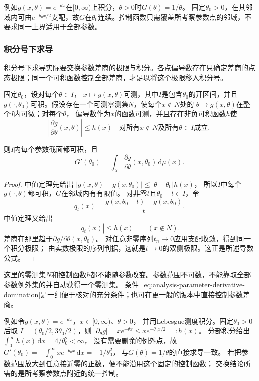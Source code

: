 例如$g(x,\theta)=e^{-\theta x}$在$[0,\infty)$上积分，$\theta>0$时$G(\theta)=1/\theta$。
固定$\theta_0>0$，在其邻域内可由$e^{-\theta_0x/2}$支配，故$G$在$\theta_0$连续。控制函数只需覆盖所考察参数点的邻域，不要求同一上界适用于全部参数。

\subsubsection{积分号下求导}

积分号下求导实际要交换参数差商的极限与积分。各点偏导数存在只确定差商的点态极限；同一个可积函数控制全部差商，才足以将这个极限移入积分号。
\begin{theorem}[可积导数界下的积分号内求导]
固定$\theta_0$，设对每个$\theta\in I$，
$x\mapsto g(x,\theta)$可测，其中$I$是包含$\theta_0$的开区间，并且
$g(\cdot,\theta_0)$可积。假设存在一个可测零测集$N$，使每个$x\notin N$处的
$\theta\mapsto g(x,\theta)$在整个$I$内可微；对每个$\theta$，
偏导数作为$x$的函数可测，并且存在非负可积函数$h$使
\begin{equation}
  \left|
    \frac{\partial g}{\partial\theta}(x,\theta)
  \right|
  \leq h(x)
  \quad
  \text{对所有$x\notin N$及所有$\theta\in I$成立},
\label{eq:analysis-parameter-derivative-domination}
\end{equation}

则$I$内每个参数截面都可积，且
\begin{equation}
  G'(\theta_0)
  =
  \int_X
  \frac{\partial g}{\partial\theta}(x,\theta_0)
  \,\mathrm{d}\mu(x).
\label{eq:analysis-differentiate-under-integral}
\end{equation}
\end{theorem}
\begin{proof}
中值定理先给出
$|g(x,\theta)-g(x,\theta_0)|\leq|\theta-\theta_0|h(x)$，
所以$I$中每个$g(\cdot,\theta)$都可积，$G$在邻域内有有限值。
对非零$t$且$\theta_0+t\in I$，令
\[
 q_t(x)=\frac{g(x,\theta_0+t)-g(x,\theta_0)}{t}.
\]
中值定理又给出
\[
 |q_t(x)|\leq h(x)\qquad(x\notin N).
\]
差商在那里趋于$\partial g/\partial\theta(x,\theta_0)$。
对任意非零序列$t_n\to0$应用支配收敛，得到同一个积分极限；
由实数极限的序列判据，这就是$t\to0$的双侧极限。这正是所述导数公式。
\end{proof}

这里的零测集$N$和控制函数$h$都不能随参数改变。参数范围不可数，不能靠取全部参数例外集的并自动获得一个零测集。
条件~\eqref{eq:analysis-parameter-derivative-domination}是一组便于核对的充分条件；也可在更一般的版本中直接控制参数差商。

例如令$g(x,\theta)=e^{-\theta x}$，$x\in[0,\infty)$、$\theta>0$，
并用Lebesgue测度积分。固定$\theta_0>0$后取
$I=(\theta_0/2,3\theta_0/2)$，则
$|\partial_\theta g|=xe^{-\theta x}\leq xe^{-\theta_0x/2}=:h(x)$。
分部积分给出$\int_0^\infty h(x)\,\mathrm dx=4/\theta_0^2<\infty$，
没有需要删除的例外点，故
$G'(\theta_0)=-\int_0^\infty xe^{-\theta_0x}\,\mathrm dx=-1/\theta_0^2$，
与$G(\theta)=1/\theta$的直接求导一致。
若把参数范围放大到任意接近零的正数，便不能沿用这个固定的控制函数；
交换结论所需的是所考察参数点附近的统一控制。

